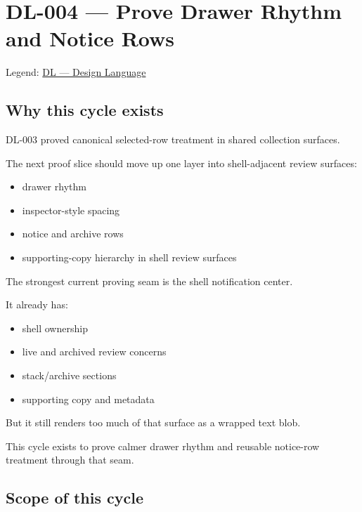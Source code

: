 \chapter{DL-004 --- Prove Drawer Rhythm and Notice Rows}\label{record-171}

\smallskip

Legend: \href{https://github.com/flyingrobots/bijou/blob/1853ad902f6bf219326409e7f743a5a1d6517dbc/docs/legends/DL-design-language.md}{DL --- Design Language}

\section{Why this cycle exists}\label{record-171-why-this-cycle-exists}

DL-003 proved canonical selected-row treatment in shared collection surfaces.

The next proof slice should move up one layer into shell-adjacent review surfaces:

\begin{itemize}
\tightlist
\item
  drawer rhythm
\item
  inspector-style spacing
\item
  notice and archive rows
\item
  supporting-copy hierarchy in shell review surfaces
\end{itemize}

The strongest current proving seam is the shell notification center.

It already has:

\begin{itemize}
\tightlist
\item
  shell ownership
\item
  live and archived review concerns
\item
  stack/archive sections
\item
  supporting copy and metadata
\end{itemize}

But it still renders too much of that surface as a wrapped text blob.

This cycle exists to prove calmer drawer rhythm and reusable notice-row treatment through that seam.

\section{Scope of this cycle}\label{record-171-scope-of-this-cycle}

